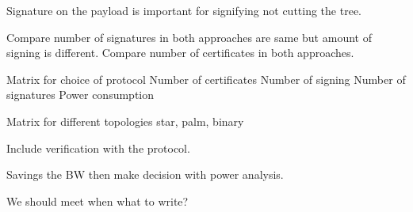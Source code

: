	Signature on the payload is important for signifying not cutting the tree.

	Compare number of signatures in both approaches are same but amount of signing is different.
	Compare number of certificates in both approaches.

	Matrix for choice of protocol
		Number of certificates
		Number of signing
		Number of signatures
		Power consumption

	Matrix for different topologies
		star, palm, binary 
		
	Include verification with the protocol.

	Savings the BW then make decision with power analysis.

We should meet when what to write?